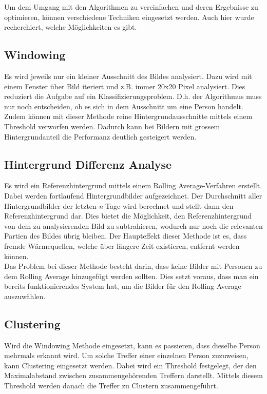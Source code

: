Um dem Umgang mit den Algorithmen zu vereinfachen und deren Ergebnisse zu optimieren, können verschiedene Techniken eingesetzt werden. Auch hier wurde recherchiert, welche Möglichkeiten es gibt.


\subsection{Windowing}

Es wird jeweils nur ein kleiner Ausschnitt des Bildes analysiert. Dazu wird mit einem Fenster über Bild iteriert und z.B. immer 20x20 Pixel analysiert. Dies reduziert die Aufgabe auf ein Klassifizierungsproblem. D.h. der Algorithmus muss nur noch entscheiden, ob es sich in dem Ausschnitt um eine Person handelt. Zudem können mit dieser Methode reine Hintergrundausschnitte mittels einem Threshold verworfen werden. Dadurch kann bei Bildern mit grossem Hintergrundanteil die Performanz deutlich gesteigert werden.


\subsection{Hintergrund Differenz Analyse}

Es wird ein Referenzhintergrund mittels einem Rolling Average-Verfahren erstellt. Dabei werden fortlaufend Hintergrundbilder aufgezeichnet. Der Durchschnitt aller Hintergrundbilder der letzten \textit{n} Tage wird berechnet und stellt dann den Referenzhintergrund dar. Dies bietet die Möglichkeit, den Referenzhintergrund von dem zu analysierenden Bild zu subtrahieren, wodurch nur noch die relevanten Partien des Bildes übrig bleiben. Der Haupteffekt dieser Methode ist es, dass fremde Wärmequellen, welche über längere Zeit existieren, entfernt werden können.\\
Das Problem bei dieser Methode besteht darin, dass keine Bilder mit Personen zu dem Rolling Average hinzugefügt werden sollten. Dies setzt voraus, dass man ein bereits funktionierendes System hat, um die Bilder für den Rolling Average auszuwählen.


\subsection{Clustering}

Wird die Windowing Methode eingesetzt, kann es passieren, dass dieselbe Person mehrmals erkannt wird. Um solche Treffer einer einzelnen Person zuzuweisen, kann Clustering eingesetzt werden. Dabei wird ein Threshold festgelegt, der den Maximalabstand zwischen zusammengehörenden Treffern darstellt. Mittels diesem Threshold werden danach die Treffer zu Clustern zusammengeführt.


